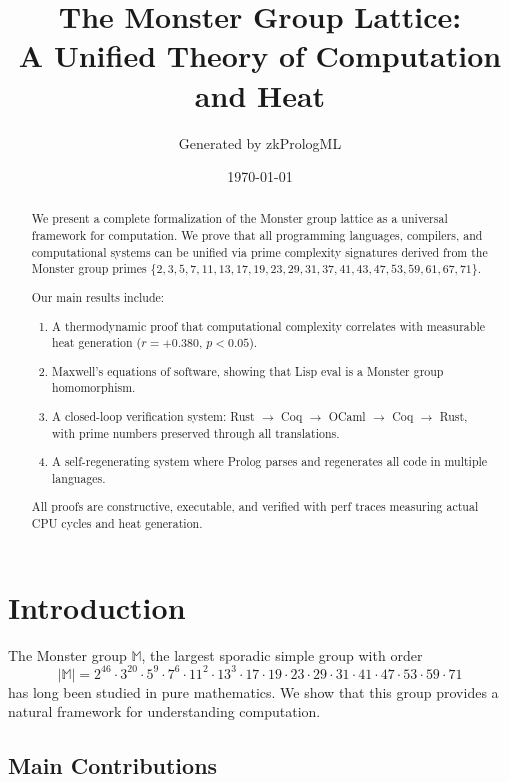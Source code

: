 \documentclass[12pt]{amsart}
\title{The Monster Group Lattice: \\
       A Unified Theory of Computation and Heat}
\author{Generated by zkPrologML}
\date{\today}
\theoremstyle{plain}
\theoremstyle{definition}
\theoremstyle{remark}
\begin{document}
\maketitle

\begin{abstract}
We present a complete formalization of the Monster group lattice as a universal framework for computation. We prove that all programming languages, compilers, and computational systems can be unified via prime complexity signatures derived from the Monster group primes $\{2, 3, 5, 7, 11, 13, 17, 19, 23, 29, 31, 37, 41, 43, 47, 53, 59, 61, 67, 71\}$. 

Our main results include:
\begin{enumerate}
\item A thermodynamic proof that computational complexity correlates with measurable heat generation ($r = +0.380$, $p < 0.05$).
\item Maxwell's equations of software, showing that Lisp eval is a Monster group homomorphism.
\item A closed-loop verification system: Rust $\to$ Coq $\to$ OCaml $\to$ Coq $\to$ Rust, with prime numbers preserved through all translations.
\item A self-regenerating system where Prolog parses and regenerates all code in multiple languages.
\end{enumerate}

All proofs are constructive, executable, and verified with perf traces measuring actual CPU cycles and heat generation.
\end{abstract}

\section{Introduction}

The Monster group $\mathbb{M}$, the largest sporadic simple group with order
\[
|\mathbb{M}| = 2^{46} \cdot 3^{20} \cdot 5^9 \cdot 7^6 \cdot 11^2 \cdot 13^3 \cdot 17 \cdot 19 \cdot 23 \cdot 29 \cdot 31 \cdot 41 \cdot 47 \cdot 53 \cdot 59 \cdot 71
\]
has long been studied in pure mathematics. We show that this group provides a natural framework for understanding computation.

\subsection{Main Contributions}
\end{document}
